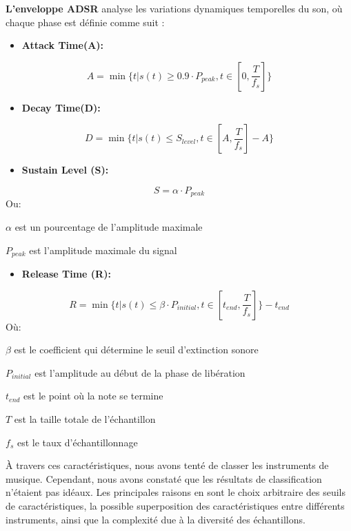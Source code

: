 \textbf{L'enveloppe ADSR }analyse les variations dynamiques temporelles du son, où chaque phase est définie comme suit :
\begin{itemize}
    \item \textbf{Attack Time(A):}
\end{itemize}
\begin{equation}
    A = \min \{t|s(t)\geq0.9 \cdot P_{peak}, t\in [0, \frac{T}{f_s}]\}
\end{equation}
\begin{itemize}
    \item \textbf{Decay Time(D):}
\end{itemize}
\begin{equation}
    D = \min \{t|s(t)\leq S_{level}, t\in [A, \frac{T}{f_s}] - A\}
\end{equation}
\begin{itemize}
    \item \textbf{Sustain Level (S):}
\end{itemize}
\begin{equation}
    S = \alpha \cdot P_{peak}
\end{equation}
Ou:
\begin{description}
    \item \(\alpha\) est un pourcentage de l'amplitude maximale
    \item \(P_{peak}\) est l'amplitude maximale du signal
\end{description}
\begin{itemize}
    \item \textbf{Release Time (R):}
\end{itemize}
\begin{equation}
    R = \min \{t |s(t) \leq \beta \cdot P_{initial}, t \in [t_{end}, \frac{T}{f_s}]  \} - t_{end}
\end{equation}
Où:
\begin{description}
    \item \(\beta\) est le coefficient qui détermine le seuil d'extinction sonore
    \item \(P_{initial}\) est l'amplitude au début de la phase de libération
    \item \(t_{end}\) est le point où la note se termine
    \item \(T\) est la taille totale de l'échantillon
    \item \(f_s\) est le taux d'échantillonnage
\end{description}

À travers ces caractéristiques, nous avons tenté de classer les instruments de musique. Cependant, nous avons constaté que les résultats de classification n'étaient pas idéaux. Les principales raisons en sont le choix arbitraire des seuils de caractéristiques, la possible superposition des caractéristiques entre différents instruments, ainsi que la complexité due à la diversité des échantillons.

